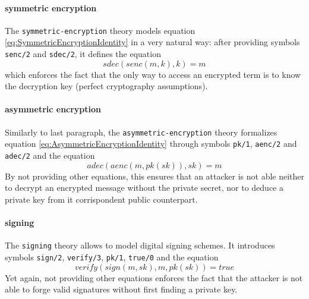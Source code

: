 \documentclass[fleqn,10pt]{SelfArx} %
\begin{document}
\paragraph{symmetric encryption}
The \lstinline|symmetric-encryption| theory models equation \ref{eq:SymmetricEncryptionIdentity} in a very natural way: after providing symbols \lstinline|senc/2| and \lstinline|sdec/2|, it defines the equation
\begin{equation*}
    sdec(senc(m,k),k) = m
\end{equation*}
which enforces the fact that the only way to access an encrypted term is to know the decryption key (perfect cryptography assumptions).

\paragraph{asymmetric encryption}
Similarly to last paragraph, the \lstinline|asymmetric-encryption| theory formalizes equation \ref{eq:AsymmetricEncryptionIdentity} through symbols \lstinline|pk/1|, \lstinline|aenc/2| and \lstinline|adec/2| and the equation
\begin{equation*}
    adec(aenc(m, pk(sk)), sk) = m
\end{equation*}
By not providing other equations, this ensures that an attacker is not able neither to decrypt an encrypted message without the private secret, nor to deduce a private key from it corrispondent public counterpart.

\paragraph{signing}
The \lstinline|signing| theory allows to model digital signing schemes. It introduces symbols \lstinline|sign/2|, \lstinline|verify/3|, \lstinline|pk/1|, \lstinline|true/0| and the equation
\begin{equation*}
    verify(sign(m,sk), m, pk(sk)) = true
\end{equation*}
Yet again, not providing other equations enforces the fact that the attacker is not able to forge valid signatures without first finding a private key.
\end{document}
